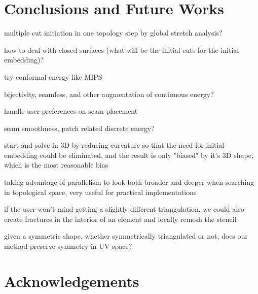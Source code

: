 \section{Conclusions and Future Works}

multiple cut initiation in one topology step by global stretch analysis?

how to deal with closed surfaces (what will be the initial cuts for the initial embedding)?

try conformal energy like MIPS

bijectivity, seamless, and other augmentation of continuous energy?

handle user preferences on seam placement

seam smoothness, patch related discrete energy?

start and solve in 3D by reducing curvature so that the need for initial embedding could be eliminated, and the result is only "biased" by it's 3D shape, which is the most reasonable bias

taking advantage of parallelism to look both broader and deeper when searching in topological space, very useful for practical implementations

if the user won't mind getting a slightly different triangulation, we could also create fractures in the interior of an element and locally remesh the stencil

given a symmetric shape, whether symmetrically triangulated or not, does our method preserve symmetry in UV space?

\section{Acknowledgements}